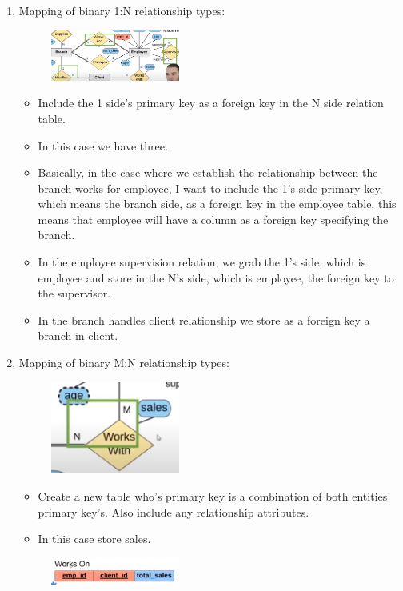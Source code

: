 \begin{enumerate}
    \item Mapping of binary 1:N relationship types:
        \begin{figure}[H]
            \centering
            \includegraphics[width=0.4\textwidth]{./Figs/2020-12-24-23-07-54.png}
        \end{figure}
        \begin{itemize}
            \item Include the 1 side's primary key as a foreign key in the N side relation table.
            \item In this case we have three.
            \item Basically, in the case where we establish the relationship between the branch works for employee, I want to include the 1's side primary key, which means the branch side, as a foreign key in the employee table, this means that employee will have a column as a foreign key specifying the branch.
            \item In the employee supervision relation, we grab the 1's side, which is employee and store in the N's side, which is employee, the foreign key to the supervisor.
            \item In the branch handles client relationship we store as a foreign key a branch in client.
        \end{itemize}
    
    \item Mapping of binary M:N relationship types:
        \begin{figure}[H]
            \centering
            \includegraphics[width=0.4\textwidth]{./Figs/2020-12-24-23-16-49.png}
        \end{figure}
        \begin{itemize}
            \item Create a new table who's primary key is a combination of both entities' primary key's. Also include any relationship attributes.
            \item In this case store sales.
        \end{itemize}
        \begin{figure}[H]
            \centering
            \includegraphics[width=0.4\textwidth]{./Figs/2020-12-24-23-16-39.png}
        \end{figure}
\end{enumerate}
